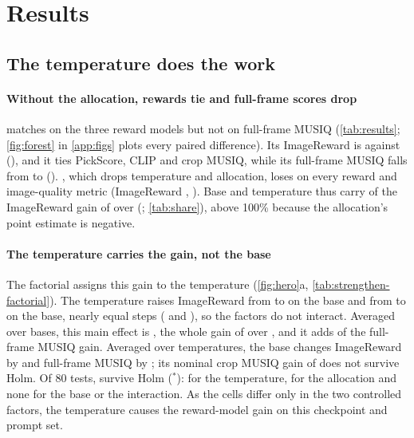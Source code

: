 \section{Results}\label{sec:results}



\subsection{The temperature does the work}\label{sec:decomp}

\paragraph{Without the allocation, rewards tie and full-frame scores drop}
\tempsb{} matches \segaofficial{} on the three reward models but not on full-frame MUSIQ (\cref{tab:results}; \cref{fig:forest} in \cref{app:figs} plots every paired difference). Its ImageReward is  against  (), and it ties PickScore, CLIP and crop MUSIQ, while its full-frame MUSIQ falls from  to  (). \ntk, which drops temperature and allocation, loses on every reward and image-quality metric (ImageReward , ). Base and temperature thus carry  of the ImageReward gain of \sega{} over \ntk{} (; \cref{tab:share}), above 100\% because the allocation's point estimate is negative.

\paragraph{The temperature carries the gain, not the base}
The factorial assigns this gain to the temperature (\cref{fig:hero}a, \cref{tab:strengthen-factorial}). The temperature raises ImageReward from  to  on the \ntk{} base and from  to  on the \sega{} base, nearly equal steps ( and ), so the factors do not interact. Averaged over bases, this main effect is  , the whole  gain of \segaofficial{} over \ntk, and it adds   of the  full-frame MUSIQ gain. Averaged over temperatures, the base changes ImageReward by   and full-frame MUSIQ by  ; its nominal crop MUSIQ gain of   does not survive Holm. Of 80 tests,  survive Holm ($^{*}$):  for the temperature,  for the allocation and none for the base or the interaction. As the cells differ only in the two controlled factors, the temperature causes the reward-model gain on this checkpoint and prompt set.

